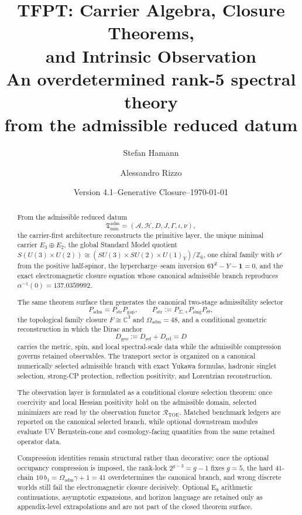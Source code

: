 \documentclass[11pt,a4paper]{article}
\title{%
    \color{tfptblue}\textbf{TFPT: Carrier Algebra, Closure Theorems,\\and Intrinsic Observation}\\[0.6em]
    {\Large\color{tfptgray} An overdetermined rank-5 spectral theory\\from the admissible reduced datum}
}
\author{Stefan Hamann \and Alessandro Rizzo}
\date{{\normalsize\color{tfptgray}\sffamily Version 4.1\enspace--\enspace Generative Closure\enspace--\enspace\today}}
\theoremstyle{definition}
\theoremstyle{remark}
\newcommand{\Seam}{\Sigma}
\newcommand{\inv}{\iota}
\newcommand{\Oadm}{\Omega_{\mathrm{adm}}}
\newcommand{\Tmin}{\mathfrak T_{\mathrm{min}}}
\newcommand{\Padm}{P_{\mathrm{adm}}}
\begin{document}
\maketitle

\begin{abstract}
From the admissible reduced datum
\[
\Tmin^{\mathrm{adm}}=(\mathcal A,\mathcal H,D,J,\Gamma,\inv,\nu),
\]
the carrier-first architecture reconstructs the primitive layer, the unique minimal carrier
$E_3\oplus E_2$, the global Standard Model quotient
$S(U(3)\times U(2))\cong(SU(3)\times SU(2)\times U(1)_Y)/\mathbb Z_6$, one chiral family
with $\nu^c$ from the positive half-spinor, the hypercharge--seam inversion
$6Y^2-Y-\mathbf 1=0$, and the exact electromagnetic closure equation whose canonical
admissible branch reproduces $\alpha^{-1}(0)=\num{137.0359992}$.

The same theorem surface then generates the canonical two-stage admissibility selector
\[
\Padm=P_{\mathrm{str}}P_{\mathrm{gap}},
\qquad
P_{\mathrm{str}}:=P_{\Seam,+}P_{\mathrm{sing}}P_\Theta,
\]
the topological family closure $F\cong\mathbb C^3$ and $\Oadm=48$, and a conditional
geometric reconstruction in which the Dirac anchor
\[
D_{\mathrm{geo}}:=D_{\mathrm{ref}}+D_{\mathrm{rel}}=D
\]
carries the metric, spin, and local spectral-scale data while the admissible compression
governs retained observables. The transport sector is organized on a canonical numerically
selected admissible branch with exact Yukawa formulas, hadronic singlet selection,
strong-CP protection, reflection positivity, and Lorentzian reconstruction.

The observation layer is formulated as a conditional closure selection theorem: once
coercivity and local Hessian positivity hold on the admissible domain, selected minimizers
are read by the observation functor $\mathcal R_{\mathrm{TOE}}$. Matched benchmark ledgers
are reported on the canonical selected branch, while optional downstream modules evaluate
UV Bernstein-cone and cosmology-facing quantities from the same retained operator data.

Compression identities remain structural rather than decorative: once the optional occupancy
compression is imposed, the rank-lock $2^{g-3}=g-1$ fixes $g=5$, the hard $41$-chain
$10\,b_1=\Omega_{\mathrm{adm}}\gamma+1=41$ overdetermines the canonical branch, and wrong
discrete worlds still fail the electromagnetic closure decisively. Optional E$_8$
arithmetic continuations, asymptotic expansions, and horizon language are retained only as
appendix-level extrapolations and are not part of the closed theorem surface.
\end{abstract}
\end{document}
